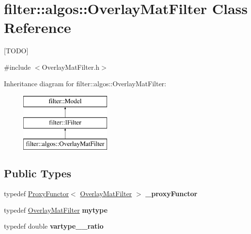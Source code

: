 \hypertarget{classfilter_1_1algos_1_1_overlay_mat_filter}{}\section{filter\+:\+:algos\+:\+:Overlay\+Mat\+Filter Class Reference}
\label{classfilter_1_1algos_1_1_overlay_mat_filter}


\mbox{[}T\+O\+DO\mbox{]}  




{\ttfamily \#include $<$Overlay\+Mat\+Filter.\+h$>$}

Inheritance diagram for filter\+:\+:algos\+:\+:Overlay\+Mat\+Filter\+:\begin{figure}[H]
\begin{center}
\leavevmode
\includegraphics[height=3.000000cm]{db/db2/classfilter_1_1algos_1_1_overlay_mat_filter}
\end{center}
\end{figure}
\subsection*{Public Types}
\begin{DoxyCompactItemize}
\item 
\mbox{\label{classfilter_1_1algos_1_1_overlay_mat_filter_a5af728478cf6d4be96923568537a8d78}} 
typedef \hyperlink{class_proxy_functor}{Proxy\+Functor}$<$ \hyperlink{classfilter_1_1algos_1_1_overlay_mat_filter}{Overlay\+Mat\+Filter} $>$ {\bfseries \+\_\+proxy\+Functor}
\item 
\mbox{\label{classfilter_1_1algos_1_1_overlay_mat_filter_af5af762b8d26238483c53d14fa5b5933}} 
typedef \hyperlink{classfilter_1_1algos_1_1_overlay_mat_filter}{Overlay\+Mat\+Filter} {\bfseries mytype}
\item 
\mbox{\label{classfilter_1_1algos_1_1_overlay_mat_filter_a3546eb5bc0620ed44edcfed15a604b75}} 
typedef double {\bfseries vartype\+\_\+\+\_\+ratio}
\end{DoxyCompactItemize}
